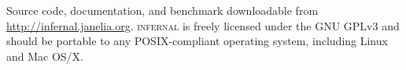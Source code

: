 \begin{comment}
Source code, documentation, and benchmark downloadable from
\url{http://infernal.janelia.org}. Freely licensed under the GNU
General Public License version 3 (GPLv3). 
\end{comment}
Source code, documentation, and benchmark downloadable from
\url{http://infernal.janelia.org}. \textsc{infernal} is freely
licensed under the GNU GPLv3
and should be portable to any POSIX-compliant operating system,
including Linux and Mac OS/X.


